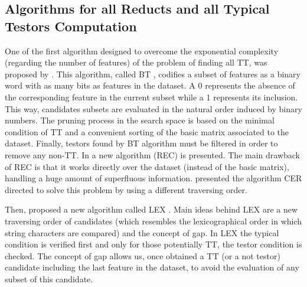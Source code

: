 \documentclass[authoryear,11pt]{elsarticle}
\makeatletter
\newcommand{\setword}[2]{%
  \phantomsection
  #1\def\@currentlabel{\unexpanded{#1}}\label{#2}%
}
\makeatother
\begin{document}
    
\subsection{Algorithms for all Reducts and all Typical Testors Computation}
  One of the first algorithm designed to overcome the exponential complexity (regarding
  the number of features) of the problem of finding all TT, was 
  proposed by \cite{Ruiz85}. This algorithm, called \setword{BT}{BT},
  codifies a subset of features as a binary word with as many bits as features in the 
  dataset. A 0 represents the absence of the corresponding feature in the current
  subset while a 1 represents its inclusion. This way, candidates subsets are evaluated
  in the natural order induced by binary numbers. The pruning process in the
  search space is based on the minimal condition of TT and a convenient sorting
  of the basic matrix associated to the dataset. Finally, 
  testors found by BT algorithm must be filtered in order to remove any non-TT.
  In \citep{Shulcloper95b} a new algorithm (REC) is presented.
  The main drawback of REC is that it works directly over the dataset (instead of the
  basic matrix), handling a huge amount of superfluous information. \cite{Ayaquica97}
  presented the algorithm CER directed to solve this problem by using a different traversing
  order. 
	
  Then, \cite{Santiesteban03} proposed a new algorithm
  called \setword{LEX}{LEX}. Main ideas behind LEX are a new traversing order of candidates (which resembles the
  lexicographical order in which string characters are compared) and the concept of gap. In LEX
  the typical condition is verified first and only for those potentially TT, the testor 
  condition is checked. %
  The concept of gap allows us, once obtained a TT (or a not testor) candidate including 
  the last feature in the dataset, to avoid the evaluation of any subset of this candidate.
	
\end{document}
